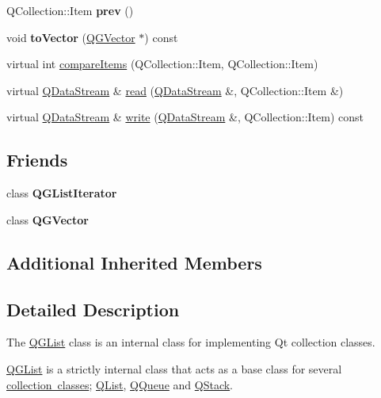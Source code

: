 \begin{DoxyCompactItemize}
Q\+Collection\+::\+Item {\bfseries prev} ()
\item 
\mbox{\label{class_q_g_list_ab353a126b1fbdec96f4c6189f8623e2f}} 
void {\bfseries to\+Vector} (\mbox{\hyperlink{class_q_g_vector}{Q\+G\+Vector}} $\ast$) const
\item 
virtual int \mbox{\hyperlink{class_q_g_list_a9a9c5fa3888371979c12e3207b3f9ec5}{compare\+Items}} (Q\+Collection\+::\+Item, Q\+Collection\+::\+Item)
\item 
virtual \mbox{\hyperlink{class_q_data_stream}{Q\+Data\+Stream}} \& \mbox{\hyperlink{class_q_g_list_a96dd0ec54d1aca071fa29432dc0c2e8e}{read}} (\mbox{\hyperlink{class_q_data_stream}{Q\+Data\+Stream}} \&, Q\+Collection\+::\+Item \&)
\item 
virtual \mbox{\hyperlink{class_q_data_stream}{Q\+Data\+Stream}} \& \mbox{\hyperlink{class_q_g_list_a6804cb8250461f60694d80debb473855}{write}} (\mbox{\hyperlink{class_q_data_stream}{Q\+Data\+Stream}} \&, Q\+Collection\+::\+Item) const
\end{DoxyCompactItemize}
\subsection*{Friends}
\begin{DoxyCompactItemize}
\item 
\mbox{\label{class_q_g_list_a13dc100371e8931a394e57af8df9fbb3}} 
class {\bfseries Q\+G\+List\+Iterator}
\item 
\mbox{\label{class_q_g_list_add83e2909bfdb7817ab2363440f946de}} 
class {\bfseries Q\+G\+Vector}
\end{DoxyCompactItemize}
\subsection*{Additional Inherited Members}


\subsection{Detailed Description}
The \mbox{\hyperlink{class_q_g_list}{Q\+G\+List}} class is an internal class for implementing Qt collection classes. 

\mbox{\hyperlink{class_q_g_list}{Q\+G\+List}} is a strictly internal class that acts as a base class for several \mbox{\hyperlink{}{collection classes}}; \mbox{\hyperlink{class_q_list}{Q\+List}}, \mbox{\hyperlink{class_q_queue}{Q\+Queue}} and \mbox{\hyperlink{class_q_stack}{Q\+Stack}}.

